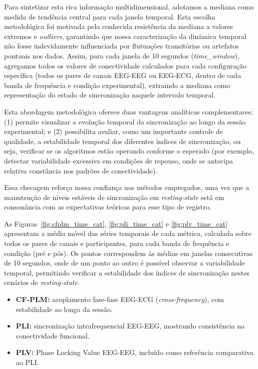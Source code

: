 Para sintetizar esta rica informação multidimensional, adotamos a mediana como medida de tendência central para cada janela temporal. Esta escolha metodológica foi motivada pela conhecida resistência da mediana a valores extremos e \textit{outliers}, garantindo que nossa caracterização da dinâmica temporal não fosse indevidamente influenciada por flutuações transitórias ou artefatos pontuais nos dados. Assim, para cada janela de 10 segundos (\textit{time\_window}), agregamos todos os valores de conectividade calculados para cada configuração específica (todos os pares de canais EEG-EEG ou EEG-ECG, dentro de cada banda de frequência e condição experimental), extraindo a mediana como representação do estado de sincronização naquele intervalo temporal.

Esta abordagem metodológica oferece duas vantagens analíticas complementares: 
(1) permite visualizar a evolução temporal da sincronização ao longo da sessão experimental; e 
(2) possibilita avaliar, como um importante controle de qualidade, a estabilidade temporal dos diferentes índices de sincronização, ou seja, verificar se os algoritmos estão operando conforme o esperado (por exemplo, detectar variabilidade excessiva em condições de repouso, onde se antecipa relativa constância nos padrões de conectividade).

Essa checagem reforça nossa confiança nos métodos empregados, uma vez que a manutenção de níveis estáveis de sincronização em \textit{resting‑state} está em consonância com as expectativas teóricas para esse tipo de registro.

As Figuras~\ref{fig:cfplm_time_cat}, \ref{fig:pli_time_cat} e \ref{fig:plv_time_cat} apresentam a média móvel das séries temporais de cada métrica, calculada sobre todos os pares de canais e participantes, para cada banda de frequência e condição (pré e pós). Os pontos correspondem às médias em janelas consecutivas de 10 segundos, onde de um ponto ao outro é possível observar a variabilidade temporal, permitindo verificar a estabilidade dos índices de sincronização nestes cenários de \textit{resting-state}.

\begin{itemize}
  \item \textbf{CF-PLM:} acoplamento fase-fase EEG-ECG (\textit{cross-frequency}), com estabilidade ao longo da sessão.
  \item \textbf{PLI:} sincronização intrafrequencial EEG-EEG, mostrando consistência na conectividade funcional.
  \item \textbf{PLV:} Phase Locking Value EEG-EEG, incluído como referência comparativa ao PLI.
\end{itemize}

